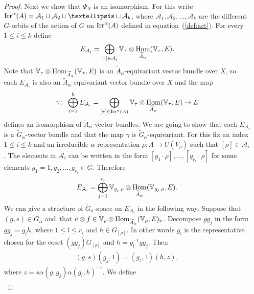 \documentclass[11pt]{article}
\numberwithin{equation}{section}
\def\V{\mathbb{V}}
\DeclareMathOperator{\Hom}{\textup{Hom}}
\DeclareMathOperator{\Irr}{\textup{Irr}}
\theoremstyle{definition}
\numberwithin{equation}{section}
\begin{document}
\begin{proof}
Next we show that $\Psi_{X}$ is an isomorphism. For this write $\Irr^{\alpha}(A)=
\mathcal{A}_{1}\sqcup\mathcal{A}_{2}\sqcup\dots \sqcup\mathcal{A}_{k}$, where
$\mathcal{A}_{1},\mathcal{A}_{2},\dots, \mathcal{A}_{k}$ are the different
$G$-orbits of the action of $G$ on $\Irr^{\alpha}(A)$ defined in equation~(\ref{def:act}).
For every $1\leq i\leq k$ define
\begin{gather*}
E_{\mathcal{A}_{i}}=\bigoplus_{[\tau]\in \mathcal{A}_{i}}
\V_{\tau}\otimes \Hom_{\widetilde{A}_{\alpha}}(\V_{\tau},E).
\end{gather*}
Note that $\V_{\tau}\otimes \Hom_{\widetilde{A}_{\alpha}}(\V_{\tau},E)$ is an
$\widetilde{A}_{\alpha}$-equivariant vector bundle over $X$, so each
$E_{\mathcal{A}_{i}}$ is also an $\widetilde{A}_{\alpha}$-equivariant vector bundle over $X$
and the map
\begin{gather*}
\gamma\colon\ \bigoplus_{i=1}^{k}E_{\mathcal{A}_{i}}=\bigoplus_{[\tau]\in \Irr^{\alpha}(A)}
\V_{\tau}\otimes \Hom_{\widetilde{A}_{\alpha}}(\V_{\tau},E)\rightarrow E
\end{gather*}
defines an isomorphism of $\widetilde{A}_{\alpha}$-vector bundles. We are going to show that each
$E_{\mathcal{A}_{i}}$ is a $\widetilde{G}_{\alpha}$-vector bundle and that the map $\gamma$ is
$\widetilde{G}_{\alpha}$-equivariant. For this fix an index $1\leq i\leq k$ and an irreducible
$\alpha$-representation $\rho\colon A\rightarrow U(V_{\rho})$ such that
$[\rho]\in\mathcal{A}_{i}$. The elements in $\mathcal{A}_{i}$ can be written in the
form $[g_{1}\cdot\rho], \dots, [g_{r_{i}}\cdot\rho]$ for some elements
$g_{1}=1,g_{2},\dots,g_{r_{i}}\in G$. Therefore
\begin{gather*}
E_{\mathcal{A}_{i}}=\bigoplus_{j=1}^{r_{i}}\V_{g_{j}\cdot\rho}\otimes
\Hom_{\widetilde{A}_{\alpha}}(\V_{g_{j}\cdot\rho},E).
\end{gather*}
We can give a structure of
$\widetilde{G}_{\alpha}$-space on $E_{\mathcal{A}_{i}}$ in the following way.
Suppose that $(g,s)\in\widetilde{G}_{\alpha}$ and~that
$v\otimes f\in \V_{\rho}\otimes \Hom_{\widetilde{A}_{\alpha}}(\V_{\rho},E)_{x}$.
Decompose $gg_{j}$ in the form $gg_{j}=g_{l}h$, where $1\leq l\leq r_{i}$ and $h\in G_{[\rho]}$.
In other words $g_{l}$ is the representative chosen for the coset
$(gg_{j})G_{[\rho]}$ and $h=g_{l}^{-1}gg_{j}$. Then
\begin{gather*}
(g,s)(g_{j},1)=(g_{l},1)(h,z),
\end{gather*}
where $z=s\alpha(g,g_{j})\alpha(g_{l},h)^{-1}$. We define
\begin{gather*}

\end{gather*}
\end{proof}
\end{document}
